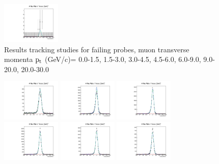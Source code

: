 \documentclass{article}
\begin{document}
\begin{figure}
    \includegraphics[width=0.25\textwidth]{../PlotsRooFitMC/croofit_trk_fail_6.pdf}
    \caption{Results tracking studies for failing probes, muon transverse momenta
    $\rm p_{t}$ (GeV/c)= {0.0-1.5}, {1.5-3.0}, {3.0-4.5}, {4.5-6.0}, 
    {6.0-9.0}, {9.0-20.0}, {20.0-30.0}}
\end{figure}

\begin{figure}
    \includegraphics[width=0.25\textwidth]{../PlotsRooFitMC/croofit_id_pass_0.pdf}
    \includegraphics[width=0.25\textwidth]{../PlotsRooFitMC/croofit_id_pass_1.pdf}
    \includegraphics[width=0.25\textwidth]{../PlotsRooFitMC/croofit_id_pass_2.pdf}
    \includegraphics[width=0.25\textwidth]{../PlotsRooFitMC/croofit_id_pass_3.pdf}
    \includegraphics[width=0.25\textwidth]{../PlotsRooFitMC/croofit_id_pass_4.pdf}
    \includegraphics[width=0.25\textwidth]{../PlotsRooFitMC/croofit_id_pass_5.pdf}

\end{figure}
\end{document}
